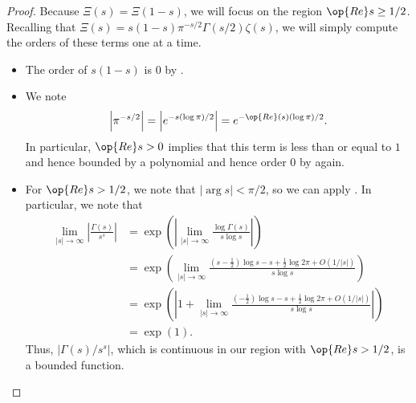 \documentclass[../notes.tex]{subfiles}
\begin{document}
\begin{proof}
	Because $\Xi(s)=\Xi(1-s)$, we will focus on the region $\op{Re}s\ge1/2$. Recalling that $\Xi(s)=s(1-s)\pi^{-s/2}\Gamma(s/2)\zeta(s)$, we will simply compute the orders of these terms one at a time.
	\begin{itemize}
		\item The order of $s(1-s)$ is $0$ by .
		\item We note
		\[\left|\pi^{-s/2}\right|=\left|e^{-s(\log\pi)/2}\right|=e^{-\op{Re}(s)(\log\pi)/2}.\]
		In particular, $\op{Re}s>0$ implies that this term is less than or equal to $1$ and hence bounded by a polynomial and hence order $0$ by  again.
		\item For $\op{Re}s>1/2$, we note that $|\arg s|<\pi/2$, so we can apply . In particular, we note that
		\begin{align*}
			\lim_{|s|\to\infty}\left|\frac{\Gamma(s)}{s^s}\right| &= \exp\left(\left|\lim_{|s|\to\infty}\frac{\log\Gamma(s)}{s\log s}\right|\right) \\
			&= \exp\left(\lim_{|s|\to\infty}\frac{\left(s-\frac12\right)\log s-s+\frac12\log2\pi+O(1/|s|)}{s\log s}\right) \\
			&= \exp\left(\left|1+\lim_{|s|\to\infty}\frac{\left(-\frac12\right)\log s-s+\frac12\log2\pi+O(1/|s|)}{s\log s}\right|\right) \\
			&= \exp(1).
		\end{align*}
		Thus, $\left|\Gamma(s)/s^s\right|$, which is continuous in our region with $\op{Re}s>1/2$, is a bounded function.
	\end{itemize}
\end{proof}
\end{document}
